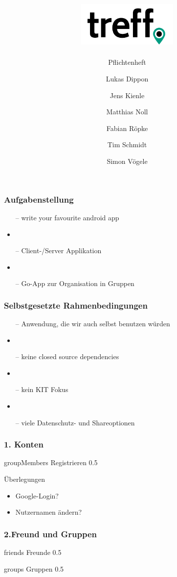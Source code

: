 \documentclass[aspectratio=1610]{beamer}
\title{\includegraphics[width = 50mm]{images/logo_crop.png}}
\subtitle{\huge Pflichtenheft}
\author{Lukas Dippon
	\and Jens Kienle
	\and Matthias Noll
	\and Fabian Röpke
	\and Tim Schmidt
	\and Simon Vögele}
\begin{document}
	
	\begin{frame}[plain]
	\maketitle
	\end{frame}

	\begin{frame}[plain]
		\frametitle{Aufgabenstellung}
		\begin{itemize}
			\item[--] write your favourite android app
			\item
			\item [--]Client-/Server Applikation
			\item
			\item[--] Go-App zur Organisation in Gruppen
		\end{itemize}
	\end{frame}

	\begin{frame}[plain]
		\frametitle{Selbstgesetzte Rahmenbedingungen}
		\begin{itemize}
			\item[--] Anwendung, die wir auch  selbst benutzen würden
			\item
			\item[--] keine closed source dependencies
			\item
			\item [--]kein KIT Fokus
			\item
			\item [--]viele Datenschutz- und Shareoptionen
		\end{itemize}
	\end{frame}

	\begin{frame}[plain]
	\frametitle{1. Konten}
	{groupMembers}
	{Registrieren}
	{0.5}%
	\begin{minipage}{0.5\textwidth}
		{Überlegungen}
		\begin{itemize}
			\item<2->[--] Google-Login?
			\item<2->[--] Nutzernamen ändern?
		\end{itemize}
	\end{minipage}
	\end{frame}

	\begin{frame}[plain]
	\frametitle{2.Freund und Gruppen}
	{friends}
	{Freunde}
	{0.5}%
	\begin{minipage}{0.5\textwidth}
		{groups}
		{Gruppen}
		{0.5}%
	\end{minipage}
	\end{frame}

	
	
\end{document}
